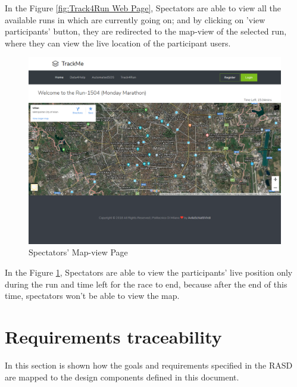 \documentclass[a4paper, hidelinks, 12pt]{report}
\begin{document}
	In the Figure \ref{fig:Track4Run Web Page}, Spectators are able to view all the available runs in which are currently going on; and by clicking on 'view participants' button, they are redirected to the map-view of the selected run, where they can view the live location of the participant users.	
	
	\begin{figure}[H]
		\centering
		\includegraphics[width=1\textwidth]{UI/spectators_map.png}
		\caption[UI: Spectators' Map-view Page]{Spectators' Map-view Page}
		\label{fig:Spectators' Map-view Page}
	\end{figure}
	
	In the Figure \ref{fig:Spectators' Map-view Page}, Spectators are able to view  the participants' live position only during the run and time left for the race to end, because after the end of this time, spectators won't be able to view the map.
	
	\chapter{Requirements traceability}
	In this section is shown how the goals and requirements specified in the RASD are mapped to the design components defined in this document.
	
\end{document}
